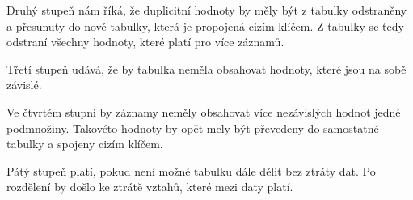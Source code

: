 Druhý stupeň nám říká, že duplicitní hodnoty by měly být z tabulky odstraněny 
a přesunuty do nové tabulky, která je propojená cizím klíčem. Z tabulky se tedy 
odstraní všechny hodnoty, které platí pro více záznamů.

Třetí stupeň udává, že by tabulka neměla obsahovat hodnoty, které jsou na sobě závislé. 

Ve čtvrtém stupni by záznamy neměly obsahovat více nezávislých hodnot jedné podmnožiny. 
Takovéto hodnoty by opět mely být převedeny do samostatné tabulky a spojeny cizím klíčem.

Pátý stupeň platí, pokud není možné tabulku dále dělit bez ztráty dat. Po 
rozdělení by došlo ke ztrátě vztahů, které mezi daty platí. \cite{normalizace}






















